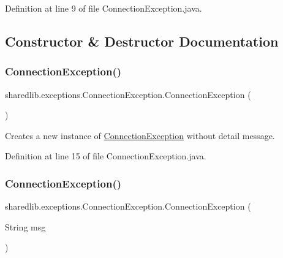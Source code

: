 Definition at line 9 of file Connection\+Exception.\+java.



\subsection{Constructor \& Destructor Documentation}
\hypertarget{classsharedlib_1_1exceptions_1_1_connection_exception_a397c11fd9538e41ab81872b57f870b53}{}\label{classsharedlib_1_1exceptions_1_1_connection_exception_a397c11fd9538e41ab81872b57f870b53} 
\subsubsection{\texorpdfstring{Connection\+Exception()}{ConnectionException()}\hspace{0.1cm}{\footnotesize\ttfamily [1/3]}}
{\footnotesize\ttfamily sharedlib.\+exceptions.\+Connection\+Exception.\+Connection\+Exception (\begin{DoxyParamCaption}{ }\end{DoxyParamCaption})}

Creates a new instance of {\ttfamily \hyperlink{classsharedlib_1_1exceptions_1_1_connection_exception}{Connection\+Exception}} without detail message. 

Definition at line 15 of file Connection\+Exception.\+java.

\hypertarget{classsharedlib_1_1exceptions_1_1_connection_exception_a17c37af7851d6482d95753064483d045}{}\label{classsharedlib_1_1exceptions_1_1_connection_exception_a17c37af7851d6482d95753064483d045} 
\subsubsection{\texorpdfstring{Connection\+Exception()}{ConnectionException()}\hspace{0.1cm}{\footnotesize\ttfamily [2/3]}}
{\footnotesize\ttfamily sharedlib.\+exceptions.\+Connection\+Exception.\+Connection\+Exception (\begin{DoxyParamCaption}\item[{String}]{msg }\end{DoxyParamCaption})}

